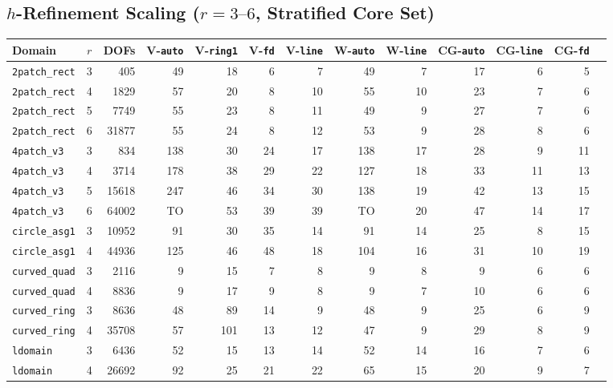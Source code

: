 \documentclass[10pt,a4paper]{article}
\begin{document}
\subsection{$h$-Refinement Scaling ($r = 3\text{--}6$, Stratified Core Set)}
\begin{center}
\scriptsize
\setlength{\tabcolsep}{3.5pt}
\begin{tabular}{@{}lcrrrrrrrrrrr@{}}
\toprule
\textbf{Domain} & $r$ & \textbf{DOFs} & \textbf{V-\texttt{auto}} & \textbf{V-\texttt{ring1}} & \textbf{V-\texttt{fd}} & \textbf{V-\texttt{line}} & \textbf{W-\texttt{auto}} & \textbf{W-\texttt{line}} & \textbf{CG-\texttt{auto}} & \textbf{CG-\texttt{line}} & \textbf{CG-\texttt{fd}} \\
\midrule
\texttt{2patch\_rect} & 3 & 405 & 49 & 18 & 6 & 7 & 49 & 7 & 17 & 6 & 5 \\
\texttt{2patch\_rect} & 4 & 1829 & 57 & 20 & 8 & 10 & 55 & 10 & 23 & 7 & 6 \\
\texttt{2patch\_rect} & 5 & 7749 & 55 & 23 & 8 & 11 & 49 & 9 & 27 & 7 & 6 \\
\texttt{2patch\_rect} & 6 & 31877 & 55 & 24 & 8 & 12 & 53 & 9 & 28 & 8 & 6 \\
\texttt{4patch\_v3} & 3 & 834 & 138 & 30 & 24 & 17 & 138 & 17 & 28 & 9 & 11 \\
\texttt{4patch\_v3} & 4 & 3714 & 178 & 38 & 29 & 22 & 127 & 18 & 33 & 11 & 13 \\
\texttt{4patch\_v3} & 5 & 15618 & 247 & 46 & 34 & 30 & 138 & 19 & 42 & 13 & 15 \\
\texttt{4patch\_v3} & 6 & 64002 & TO & 53 & 39 & 39 & TO & 20 & 47 & 14 & 17 \\
\texttt{circle\_asg1} & 3 & 10952 & 91 & 30 & 35 & 14 & 91 & 14 & 25 & 8 & 15 \\
\texttt{circle\_asg1} & 4 & 44936 & 125 & 46 & 48 & 18 & 104 & 16 & 31 & 10 & 19 \\
\texttt{curved\_quad} & 3 & 2116 & 9 & 15 & 7 & 8 & 9 & 8 & 9 & 6 & 6 \\
\texttt{curved\_quad} & 4 & 8836 & 9 & 17 & 9 & 8 & 9 & 7 & 10 & 6 & 6 \\
\texttt{curved\_ring} & 3 & 8636 & 48 & 89 & 14 & 9 & 48 & 9 & 25 & 6 & 9 \\
\texttt{curved\_ring} & 4 & 35708 & 57 & 101 & 13 & 12 & 47 & 9 & 29 & 8 & 9 \\
\texttt{ldomain} & 3 & 6436 & 52 & 15 & 13 & 14 & 52 & 14 & 16 & 7 & 6 \\
\texttt{ldomain} & 4 & 26692 & 92 & 25 & 21 & 22 & 65 & 15 & 20 & 9 & 7 \\

\end{tabular}
\end{center}
\end{document}
